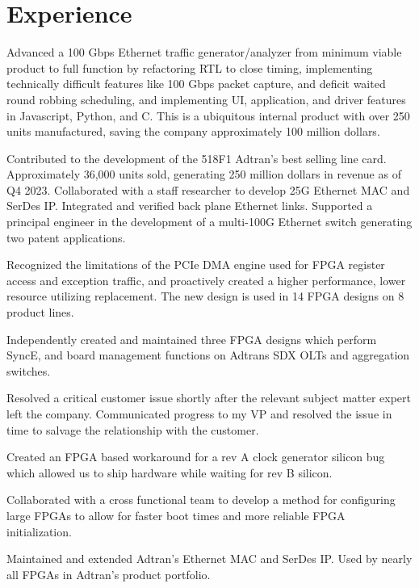 \documentclass[10pt]{deedy-resume-reversed}
\begin{document}
\begin{minipage}[t]{1.0\textwidth}
\section{Experience}
\vspace{\topsep} %
\begin{tightemize}
\item Advanced a 100 Gbps Ethernet traffic generator/analyzer from minimum viable product to full function by refactoring RTL to close timing, implementing technically difficult features like 100 Gbps packet capture, and deficit waited round robbing scheduling, and implementing UI, application, and driver features in Javascript, Python, and C. This is a ubiquitous internal product with over 250 units manufactured, saving the company approximately 100 million dollars.
\item Contributed to the development of the 518F1 Adtran’s best selling line card. Approximately  36,000 units sold, generating 250 million dollars in revenue as of Q4 2023. 
Collaborated with a staff researcher to develop 25G Ethernet MAC and SerDes IP.
Integrated and verified back plane Ethernet links.
Supported a principal engineer in the development of a multi-100G Ethernet switch generating two patent applications.
\item Recognized the limitations of the PCIe DMA engine used for FPGA register access and exception traffic, and proactively created a higher performance, lower resource utilizing replacement. The new design is used in 14 FPGA designs on 8 product lines.
\item Independently created and maintained three FPGA designs which perform SyncE, and board management functions on Adtrans SDX OLTs and aggregation switches. 
\item Resolved a critical customer issue shortly after the relevant subject matter expert left the company. Communicated progress to my VP and resolved the issue in time to salvage the relationship with the customer.
\item Created an FPGA based workaround for a rev A clock generator silicon bug which allowed us to ship hardware while waiting for rev B silicon.
\item Collaborated with a cross functional team to develop a method for configuring large FPGAs to allow for faster boot times and more reliable FPGA initialization.
\item Maintained and extended Adtran’s Ethernet MAC and SerDes IP. Used by nearly all FPGAs in Adtran’s product portfolio.

\end{tightemize}
\end{minipage}
\end{document}

